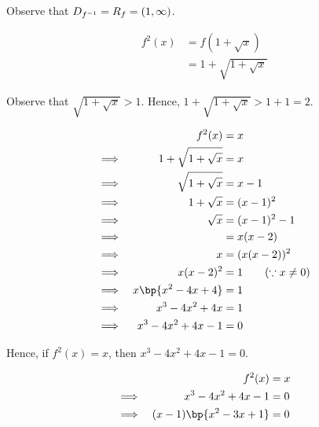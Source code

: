 \documentclass{echw}
\begin{document}

                Observe that $D_{f^{-1}} = R_{f} = (1, \infty)$.


            \subpart
                \begin{align*}
                    f^2(x) &= f(1+\sqrt{x})\\
                    &= 1 + \sqrt{1 + \sqrt{x}}
                \end{align*}


                Observe that $\sqrt{1 + \sqrt{x}} > 1$. Hence, $1 + \sqrt{1 + \sqrt{x}} > 1 + 1 = 2$.


            \subpart
                \begin{alignat*}{2}
                    &&f^2(x) &= x\\
                    \implies&& 1 + \sqrt{1 + \sqrt{x}} &= x\\
                    \implies&& \sqrt{1 + \sqrt{x}} &= x - 1\\
                    \implies&& 1 + \sqrt{x} &= (x - 1)^2\\
                    \implies&& \sqrt{x} &= (x - 1)^2 - 1\\
                    \implies&& &= x(x-2)\\
                    \implies&& x &= (x(x-2))^2\\
                    \implies&& x(x-2)^2 &= 1 \qquad (\because x \neq 0)\\
                    \implies&& x\bp{x^2 -4x + 4 } &= 1 \\
                    \implies&& x^3 -4x^2 + 4x  &= 1 \\
                    \implies&& x^3 -4x^2 + 4x -1 &= 0 \\
                \end{alignat*}

                Hence, if $f^2(x) = x$, then $x^3 -4x^2 + 4x -1 = 0$.

                \begin{alignat*}{2}
                    &&f^2(x) &= x\\
                    \implies&&x^3 -4x^2 + 4x -1 &= 0 \\
                    \implies&&(x-1)\bp{x^2-3x+1} &= 0
                \end{alignat*}
\end{document}
